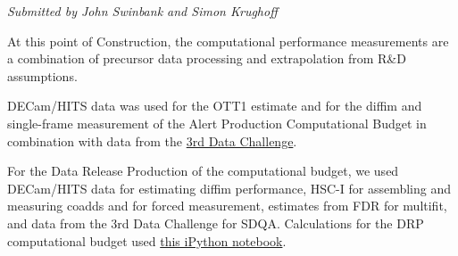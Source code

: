 \emph{Submitted by John Swinbank and Simon Krughoff}

At this point of Construction, the computational performance
measurements are a combination of precursor data processing and
extrapolation from R\&D assumptions.

DECam/HITS data was used for the OTT1 estimate and for the diffim and
single-frame measurement of the Alert Production Computational Budget in
combination with data from the
\href{https://dev.lsstcorp.org/trac/wiki/DC3bPT1_1}{3rd Data Challenge}.

For the Data Release Production of the computational budget, we used
DECam/HITS data for estimating diffim performance, HSC-I for assembling
and measuring coadds and for forced measurement, estimates from FDR for
multifit, and data from the 3rd Data Challenge for SDQA. Calculations
for the DRP computational budget used
\href{https://github.com/lsst-dm/kpm/blob/29c053f7b832e8bd999527e012681826fc0c201c/DLP-314:\%20DRP\%20Computational\%20Budget/LSST\%20DRP\%20Computational\%20Budget.ipynb}{this
iPython notebook}.

